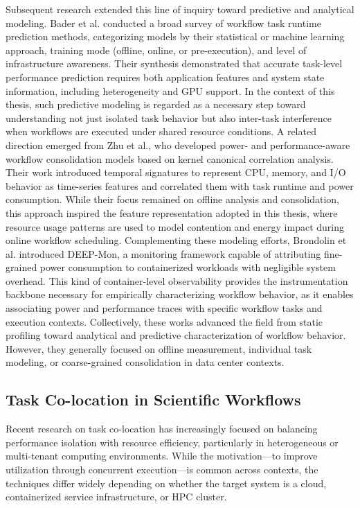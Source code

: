 Subsequent research extended this line of inquiry toward predictive and analytical modeling. Bader et al. conducted a broad survey of workflow task runtime prediction methods, categorizing models by their statistical or machine learning approach, training mode (offline, online, or pre-execution), and level of infrastructure awareness. Their synthesis demonstrated that accurate task-level performance prediction requires both application features and system state information, including heterogeneity and GPU support. In the context of this thesis, such predictive modeling is regarded as a necessary step toward understanding not just isolated task behavior but also inter-task interference when workflows are executed under shared resource conditions.
A related direction emerged from Zhu et al., who developed power- and performance-aware workflow consolidation models based on kernel canonical correlation analysis. Their work introduced temporal signatures to represent CPU, memory, and I/O behavior as time-series features and correlated them with task runtime and power consumption. While their focus remained on offline analysis and consolidation, this approach inspired the feature representation adopted in this thesis, where resource usage patterns are used to model contention and energy impact during online workflow scheduling.
Complementing these modeling efforts, Brondolin et al. introduced DEEP-Mon, a monitoring framework capable of attributing fine-grained power consumption to containerized workloads with negligible system overhead. This kind of container-level observability provides the instrumentation backbone necessary for empirically characterizing workflow behavior, as it enables associating power and performance traces with specific workflow tasks and execution contexts.
Collectively, these works advanced the field from static profiling toward analytical and predictive characterization of workflow behavior. However, they generally focused on offline measurement, individual task modeling, or coarse-grained consolidation in data center contexts. 

\subsection{Task Co-location in Scientific Workflows}
\label{sec:relatedwork_task_colocation_scientific_workflows}

Recent research on task co-location has increasingly focused on balancing performance isolation with resource efficiency, particularly in heterogeneous or multi-tenant computing environments. While the motivation—to improve utilization through concurrent execution—is common across contexts, the techniques differ widely depending on whether the target system is a cloud, containerized service infrastructure, or HPC cluster.

